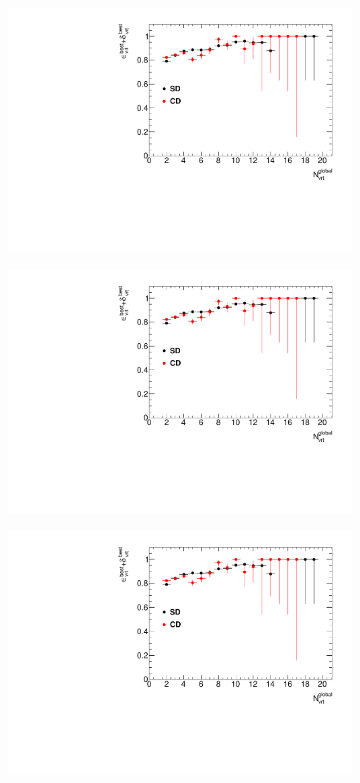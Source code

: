 \begin{figure}[H]
{\begin{subfigure}[b]{\linewidth}{
				{\includegraphics[width=\linewidth, page=25]{graphics/vertexing/vertexEffi.pdf}}}
		\end{subfigure}
	}
	\parbox{0.3\textwidth}{
		\centering
		\begin{subfigure}[b]{\linewidth}{
				{\includegraphics[width=\linewidth, page=28]{graphics/vertexing/vertexEffi.pdf}}}
		\end{subfigure}
	}
	\quad
	\parbox{0.3\textwidth}{
		\centering
		\begin{subfigure}[b]{\linewidth}{
				{\includegraphics[width=\linewidth, page=31]{graphics/vertexing/vertexEffi.pdf}}}
		\end{subfigure}
	}
	\parbox{0.3\textwidth}{
			\centering
}
\end{figure}
